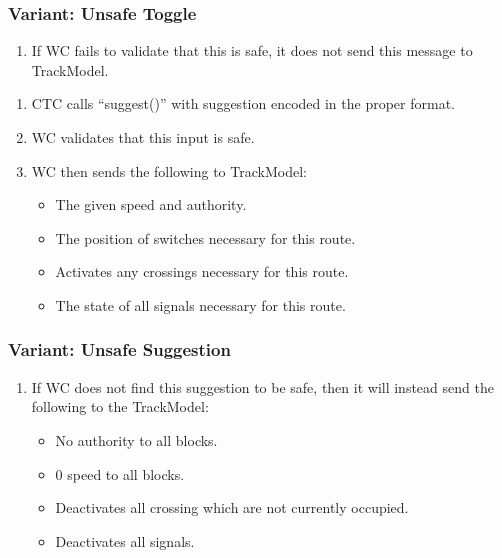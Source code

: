 \documentclass{scrreprt}
\begin{document}
    \subsubsection{Variant: Unsafe Toggle}
    \begin{enumerate}[label=3\alph*.]
        \item If WC fails to validate that this is safe, it does not send this message to TrackModel.
    \end{enumerate}

    \begin{enumerate}
        \item CTC calls ``suggest()'' with suggestion encoded in the proper format.
        \item WC validates that this input is safe.
        \item WC then sends the following to TrackModel:
            \begin{itemize}
                \item The given speed and authority.
                \item The position of switches necessary for this route.
                \item Activates any crossings necessary for this route.
                \item The state of all signals necessary for this route.
            \end{itemize}
    \end{enumerate}

    \subsubsection{Variant: Unsafe Suggestion}
    \begin{enumerate}[label=\arabic*a., start=3]
        \item If WC does not find this suggestion to be safe, then it will instead send the following to the TrackModel:
            \begin{itemize}
                \item No authority to all blocks.
                \item 0 speed to all blocks.
                \item Deactivates all crossing which are not currently occupied.
                \item Deactivates all signals.
            \end{itemize}
    \end{enumerate}
\end{document}
